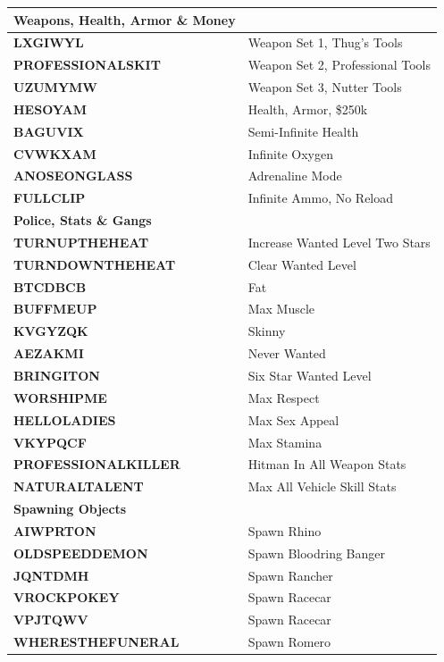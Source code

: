 \documentclass{article}
\begin{document}
\begin{small}
	\begin{longtable}{|l l|}
	\hline
	\textbf{Weapons, Health, Armor \& Money}& \\
	\hline
	\textbf{LXGIWYL }& Weapon Set 1, Thug's Tools \\
	\textbf{PROFESSIONALSKIT }& Weapon Set 2, Professional Tools \\
	\textbf{UZUMYMW }& Weapon Set 3, Nutter Tools \\
	\textbf{HESOYAM }& Health, Armor, \$250k \\
	\textbf{BAGUVIX }& Semi-Infinite Health \\
	\textbf{CVWKXAM }& Infinite Oxygen \\
	\textbf{ANOSEONGLASS }& Adrenaline Mode \\
	\textbf{FULLCLIP }& Infinite Ammo, No Reload \\
	\hline
	\hline
	\textbf{Police, Stats \& Gangs}& \\
	\hline
	\textbf{TURNUPTHEHEAT }& Increase Wanted Level Two Stars \\
	\textbf{TURNDOWNTHEHEAT }& Clear Wanted Level \\
	\textbf{BTCDBCB }& Fat \\
	\textbf{BUFFMEUP }& Max Muscle \\
	\textbf{KVGYZQK }& Skinny \\
	\textbf{AEZAKMI }& Never Wanted \\
	\textbf{BRINGITON }& Six Star Wanted Level \\
	\textbf{WORSHIPME }& Max Respect \\
	\textbf{HELLOLADIES }& Max Sex Appeal \\
	\textbf{VKYPQCF }& Max Stamina \\
	\textbf{PROFESSIONALKILLER }& Hitman In All Weapon Stats \\
	\textbf{NATURALTALENT }& Max All Vehicle Skill Stats \\
	\hline
	\hline
	\textbf{Spawning Objects}& \\
	\hline
	\textbf{AIWPRTON }& Spawn Rhino \\
	\textbf{OLDSPEEDDEMON }& Spawn Bloodring Banger \\
	\textbf{JQNTDMH }& Spawn Rancher \\
	\textbf{VROCKPOKEY }& Spawn Racecar \\
	\textbf{VPJTQWV }& Spawn Racecar \\
	\textbf{WHERESTHEFUNERAL }& Spawn Romero \\

\end{longtable}
\end{small}
\end{document}
